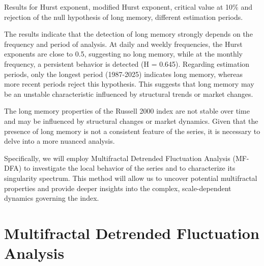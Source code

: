 \documentclass[11pt]{extarticle}
\begin{document}
\FloatBarrier

\begin{table}[h!]
    \centering
    \caption{Results for Hurst exponent, modified Hurst exponent, critical value at 10\% and rejection of the null
    hypothesis of long memory, different estimation periods.}
    \label{tab:timestamp_analysis}
\end{table}

\FloatBarrier

The results indicate that the detection of long memory strongly depends on the frequency and period of analysis.
At daily and weekly frequencies, the Hurst exponents are close to 0.5, suggesting no long memory, while at the monthly
frequency, a persistent behavior is detected (H = 0.645). Regarding estimation periods, only the longest period
(1987-2025) indicates long memory, whereas more recent periods reject this hypothesis. This suggests that long memory
may be an unstable characteristic influenced by structural trends or market changes.


The long memory properties of the Russell 2000 index are not stable over time and may be influenced by
structural changes or market dynamics. Given that the presence of long memory is not a consistent feature of the series,
it is necessary to delve into a more nuanced analysis.


Specifically, we will employ Multifractal Detrended Fluctuation Analysis (MF-DFA) to investigate the local behavior of
the series and to characterize its singularity spectrum. This method will allow us to uncover potential multifractal
properties and provide deeper insights into the complex, scale-dependent dynamics governing the index.




\section{Multifractal Detrended Fluctuation Analysis}
\end{document}
